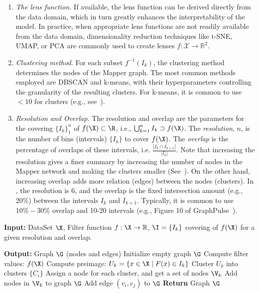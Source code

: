 \begin{enumerate}
    \item \textit{The lens function.} If available, the lens function can be derived directly from the data domain, which in turn greatly enhances the interpretability of the model. In practice, when appropriate lens functions are not readily available from the data domain, dimensionality reduction techniques like t-SNE, UMAP, or PCA are commonly used to create lenses \( f: \mathcal{X} \to \mathbb{R}^2 \). 
    \item \textit{Clustering method.} For each subset $f^{-1}(I_k)$, the clustering method determines the nodes of the Mapper graph. The most common methods employed are DBSCAN and k-means, with their hyperparameters controlling the granularity of the resulting clusters.
    For k-means, it is common to use $<10$ for clusters (e.g., see~\cite[Figure 10]{shamsi2024graphpulse}).
    
    \item {\em Resolution and Overlap.} The resolution and overlap are the parameters for the covering $\{I_k\}_1^n$ of $f(\X)\subset \R$, i.e., $\bigcup_{k=1}^n I_k\supset f(\X)$. 
    The {\em resolution}, $n$, is the number of bins (intervals) $\{I_k\}$ to cover $f(\X)$. The {\em overlap} is the percentage of overlaps of these intervals, i.e. $\frac{|I_k\cap I_{k+1}|}{|I_k|}$.  Note that increasing the resolution gives a finer summary by increasing the number of nodes in the Mapper network and making the clusters smaller (See~). On the other hand, increasing overlap adds more relation (edges) between the nodes (clusters).  In , the resolution is 6, and the overlap is the fixed intersection amount (e.g., 20\%) between the intervals $I_k$ and $I_{k+1}$. Typically, it is common to use $10\%-30\%$ overlap and 10-20 intervals (e.g., Figure 10 of GraphPulse~\cite{shamsi2024graphpulse}).
\end{enumerate}

 
 

\begin{algorithm}
\caption{Mapper Algorithm}
\label{alg:mapper}
\begin{algorithmic}[1]
\State \textbf{Input:} DataSet $\X$, Filter function $f: \X \to \mathbb{R}$, $\I = \{I_k\}$ covering of $f(\X)$ for a given resolution and overlap.
 
\State \textbf{Output:} Graph $\G$ (nodes and edges)
\State Initialize empty graph $\G$
\State Compute filter values: $f(\X)$
 
    \State Compute preimage: $U_k = \{x \in \X \mid F(x) \in I_k\}$
    \State Cluster $U_k$ into clusters $\{C_i\}$
    \State Assign a node for each cluster, and get a set of nodes $\V_k$
    \State Add nodes in $\V_k$ to graph $\G$
\EndFor
{} 
        \State Add edge $(v_i, v_j)$ to $\G$
    \EndIf
\EndFor
\State \textbf{Return} Graph $\G$
\end{algorithmic}
\end{algorithm}




